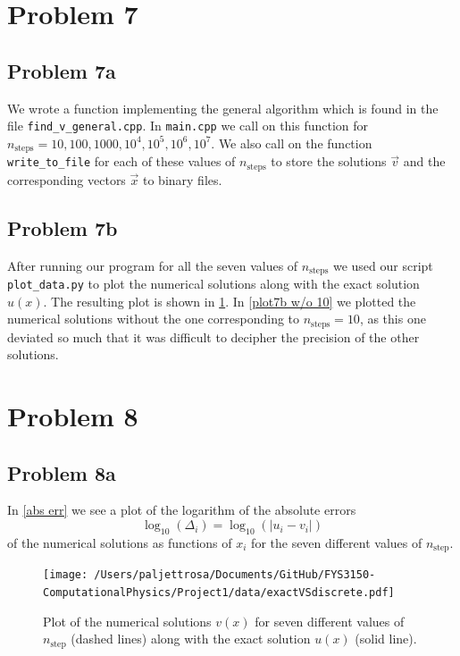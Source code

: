 \documentclass[english,notitlepage]{revtex4-1}  %
\begin{document}
\section*{Problem 7}
\subsection*{Problem 7a}
We wrote a function implementing the general algorithm which is found in the file \verb|find_v_general.cpp|. In \verb|main.cpp| we call on this function for $n_\text{steps} = 10, 100, 1000, 10^4, 10^5, 10^6, 10^7$. We also call on the function \verb|write_to_file| for each of these values of $n_\text{steps}$ to store the solutions $\vec{v}$ and the corresponding vectors $\vec{x}$ to binary files.

\subsection*{Problem 7b}
After running our program for all the seven values of $n_\text{steps}$ we used our script \verb|plot_data.py| to plot the numerical solutions along with the exact solution $u(x)$. The resulting plot is shown in \cref{plot7b}. In \cref{plot7b w/o 10} we plotted the numerical solutions without the one corresponding to $n_\text{steps} = 10$, as this one deviated so much that it was difficult to decipher the precision of the other solutions.

\section*{Problem 8}
\subsection*{Problem 8a}
In \cref*{abs err} we see a plot of the logarithm of the absolute errors 
\begin{equation}
    \log_{10}(\Delta_i) = \log_{10}(|u_i - v_i|)
\end{equation}
of the numerical solutions as functions of $x_i$ for the seven different values of $n_\text{step}$.

\begin{figure}[h!]
    \centering 
    \texttt{[image: /Users/paljettrosa/Documents/GitHub/FYS3150-ComputationalPhysics/Project1/data/exactVSdiscrete.pdf]} %
    \caption{Plot of the numerical solutions $v(x)$ for seven different values of $n_\text{step}$ (dashed lines) along with the exact solution $u(x)$ (solid line).}
    \label{plot7b}
\end{figure}
\end{document}

